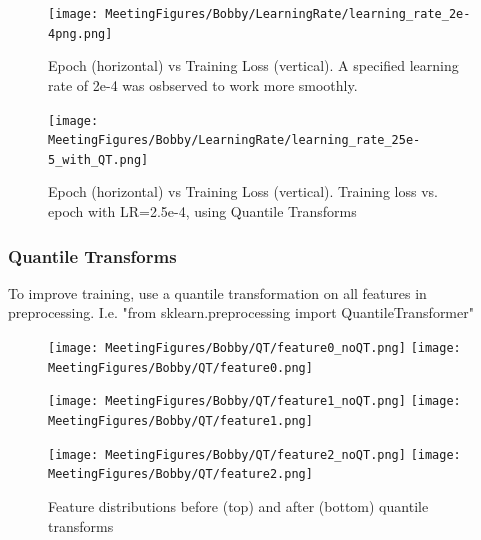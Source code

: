 \begin{figure}[!ht]
\centering
\texttt{[image: MeetingFigures/Bobby/LearningRate/learning\_rate\_2e-4png.png]}
\label{fig: jul8_pion_comparison}
\caption{Epoch (horizontal) vs Training Loss (vertical). A specified learning rate of 2e-4 was osbserved to work more smoothly.}
\end{figure}



\begin{figure}[!ht]
\centering
\texttt{[image: MeetingFigures/Bobby/LearningRate/learning\_rate\_25e-5\_with\_QT.png]}
\label{fig: jul8_pion_comparison}
\caption{Epoch (horizontal) vs Training Loss (vertical). Training loss vs. epoch with LR=2.5e-4, using Quantile Transforms }
\end{figure}




\subsubsection{Quantile Transforms}
To improve training, use a quantile transformation on all features in preprocessing. I.e. "from sklearn.preprocessing import QuantileTransformer"
\begin{figure}[!ht]
    \centering
    \begin{minipage}{.3\textwidth}
    
        \centering
        \texttt{[image: MeetingFigures/Bobby/QT/feature0\_noQT.png]}
        \texttt{[image: MeetingFigures/Bobby/QT/feature0.png]}

    \end{minipage}%
    \begin{minipage}{.3\textwidth}
    
        \centering
        \texttt{[image: MeetingFigures/Bobby/QT/feature1\_noQT.png]}
        \texttt{[image: MeetingFigures/Bobby/QT/feature1.png]}

    \end{minipage}%
    \begin{minipage}{.3\textwidth}
    
        \centering
        \texttt{[image: MeetingFigures/Bobby/QT/feature2\_noQT.png]}
        \texttt{[image: MeetingFigures/Bobby/QT/feature2.png]}

    \end{minipage}%
    \caption{Feature distributions before (top) and after (bottom) quantile transforms}
    \label{fig:16features}
\end{figure}

